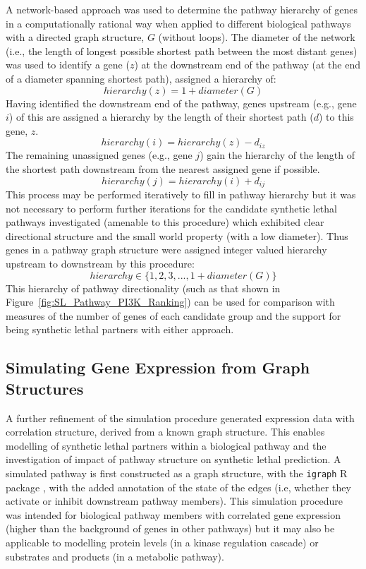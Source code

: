 A network-based approach was used to determine the pathway hierarchy of genes in a computationally rational way when applied to different biological pathways with a directed graph structure, $G$ (without loops). The diameter of the network (i.e., the length of longest possible shortest path between the most distant genes) was used to identify a gene ($z$) at the downstream end of the pathway (at the end of a diameter spanning shortest path), assigned a hierarchy of: $$hierarchy(z) = 1 + diameter(G)$$ Having identified the downstream end of the pathway, genes upstream (e.g., gene $i$) of this are assigned a hierarchy by the length of their shortest path ($d$) to this gene, $z$. $$hierarchy(i) = hierarchy(z) - d_{iz}$$ The remaining unassigned genes (e.g., gene $j$) gain the hierarchy of the length of the shortest path downstream from the nearest assigned gene if possible. $$hierarchy(j) = hierarchy(i) + d_{ij}$$ This process may be performed iteratively to fill in pathway hierarchy but it was not necessary to perform further iterations for the candidate synthetic lethal pathways investigated (amenable to this procedure) which exhibited clear directional structure and the small world property (with a low diameter). Thus genes in a pathway graph structure were assigned integer valued hierarchy upstream to downstream by this procedure: $$hierarchy \in \{1, 2, 3, ..., 1 + diameter(G)\}$$
This hierarchy of pathway directionality (such as that shown in Figure~\ref{fig:SL_Pathway_PI3K_Ranking}) can be used for comparison with measures of the number of genes of each candidate group and the support for being synthetic lethal partners with either approach.

\subsection{Simulating Gene Expression from Graph Structures} \label{methods:graphsim}
A further refinement of the simulation procedure generated expression data with correlation structure, derived from a known graph structure. %
This enables modelling of synthetic lethal partners within a biological pathway and the investigation of impact of pathway structure on synthetic lethal prediction. A simulated pathway is first constructed as a graph structure, with the \texttt{igraph} R package \citet{igraph}, with the added annotation of the state of the edges (i.e, whether they activate or inhibit downstream pathway members). This simulation procedure was intended for biological pathway members with correlated gene expression (higher than the background of genes in other pathways) but it may also be applicable to modelling protein levels (in a kinase regulation cascade) or substrates and products (in a metabolic pathway).%

